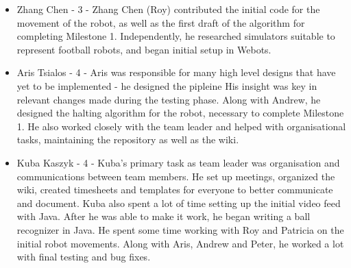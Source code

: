 \documentclass[dvips]{article}
\begin{document}
\begin{itemize}
\item Zhang Chen - 3 - Zhang Chen (Roy) contributed the initial code for the movement of the robot, as well as the first draft of the algorithm for completing Milestone 1. Independently, he researched simulators suitable to represent football robots, and began initial setup in Webots.
\item Aris Tsialos - 4 - Aris was responsible for many high level designs that have yet to be implemented - he designed the pipleine His insight was key in relevant changes made during the testing phase. Along with Andrew, he designed the halting algorithm for the robot, necessary to complete Milestone 1. He also worked closely with the team leader and helped with organisational tasks, maintaining the repository as well as the wiki.
\item Kuba Kaszyk - 4 - Kuba's primary task as team leader was organisation and communications between team members. He set up meetings, organized the wiki, created timesheets and templates for everyone to better communicate and document. Kuba also spent a lot of time setting up the initial video feed with Java. After he was able to make it work, he began writing a ball recognizer in Java. He spent some time working with Roy and Patricia on the initial robot movements. Along with Aris, Andrew and Peter, he worked a lot with final testing and bug fixes.
\end{itemize}
\end{document}
